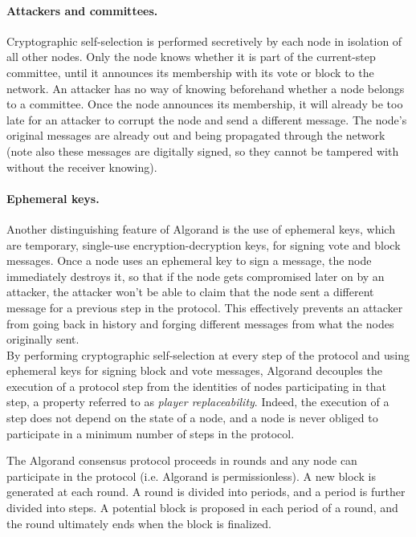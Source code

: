\paragraph{Attackers and committees.} Cryptographic self-selection is performed secretively by each node in isolation of all other nodes. Only the node knows whether it is part of the current-step committee, until it announces its membership with its vote or block to the network. An attacker has no way of knowing beforehand whether a node belongs to a committee. Once the node announces its membership, it will already be too late for an attacker to corrupt the node and send a different message. The node's original messages are already out and being propagated through the network (note also these messages are digitally signed, so they cannot be tampered with without the receiver knowing).

\paragraph{Ephemeral keys.} Another distinguishing feature of Algorand is the use of ephemeral keys, which are temporary, single-use encryption-decryption keys, for signing vote and block messages. Once a node uses an ephemeral key to sign a message, the node immediately destroys it, so that if the node gets compromised later on by an attacker, the attacker won't be able to claim that the node sent a different message for a previous step in the protocol. This effectively prevents an attacker from going back in history and forging different messages from what the nodes originally sent.\\

\noindent By performing cryptographic self-selection at every step of the protocol and using ephemeral keys for signing block and vote messages, Algorand decouples the execution of a protocol step from the identities of nodes participating in that step, a property referred to as \emph{player replaceability}. Indeed, the execution of a step does not depend on the state of a node, and a node is never obliged to participate in a minimum number of steps in the protocol.

The Algorand consensus protocol proceeds in rounds and any node can participate in the protocol (i.e. Algorand is permissionless). A new block is generated at each round. A round is divided into periods, and a period is further divided into steps. A potential block is proposed in each period of a round, and the round ultimately ends when the block is finalized.

